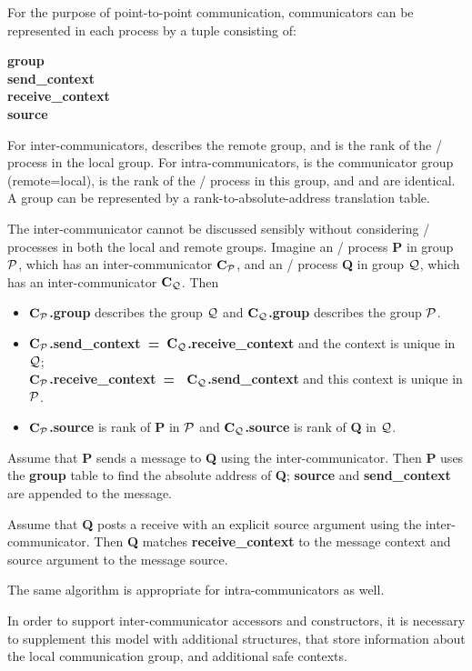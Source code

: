 \begin{implementors}
For the purpose of point-to-point communication,
communicators can be represented in each process by a tuple consisting of:
\begin{obeylines}
\textbf{group}
\textbf{send\_context}
\textbf{receive\_context}
\textbf{source}
\end{obeylines}

\noindent For inter-communicators,  describes the remote group,
and
 is the rank of the \MPI/ process in the local group.
For intra-communicators,  is the communicator group
(remote=local),  is the rank of the \MPI/ process in this group,
and  and  are identical.
A group
can be
represented by a rank-to-absolute-address translation table.

The inter-communicator cannot be discussed sensibly without
considering \MPI/ processes in both the local and remote groups. Imagine an
\MPI/ process \textbf{P} in group $\cal P$, which has an inter-communicator
\textbf{$\textbf{C}_{\cal P}$}, and an \MPI/ process
\textbf{Q} in group $\cal Q$, which has an inter-communicator
\textbf{$\textbf{C}_{\cal Q}$}.
Then
\begin{itemize}
\item
\textbf{$\textbf{C}_{\cal P}$.group} describes the group $\cal Q$ and \textbf{$\textbf{C}_{\cal Q}$.group}
describes the group $\cal P$.
\item
\textbf{$\textbf{C}_{\cal P}$.send\_context~=~$\textbf{C}_{\cal Q}$.receive\_context} and the context is
unique in $\cal Q$; \\
\textbf{$\textbf{C}_{\cal P}$.receive\_context~=~ $\textbf{C}_{\cal Q}$.send\_context} and this context is
unique in $\cal P$.
\item
\textbf{$\textbf{C}_{\cal P}$.source} is rank of \textbf{P} in $\cal P$ and \textbf{$\textbf{C}_{\cal Q}$.source} is
rank of \textbf{Q} in $\cal Q$.
\end{itemize}

Assume that \textbf{P} sends a message to \textbf{Q} using the
inter-communicator. Then \textbf{P} uses the \textbf{group} table to find
the absolute address of \textbf{Q}; \textbf{source} and \textbf{send\_context}
are appended to the message.

Assume that \textbf{Q} posts a receive with an explicit source argument
using the inter-communicator. Then \textbf{Q} matches
\textbf{receive\_context} to the message context and source argument to the
message source.

The same algorithm is appropriate for intra-communicators as well.

In order to support inter-communicator accessors and constructors, it
is necessary to supplement this model with additional structures, that
store information about the local communication group, and additional
safe contexts.
\end{implementors}

